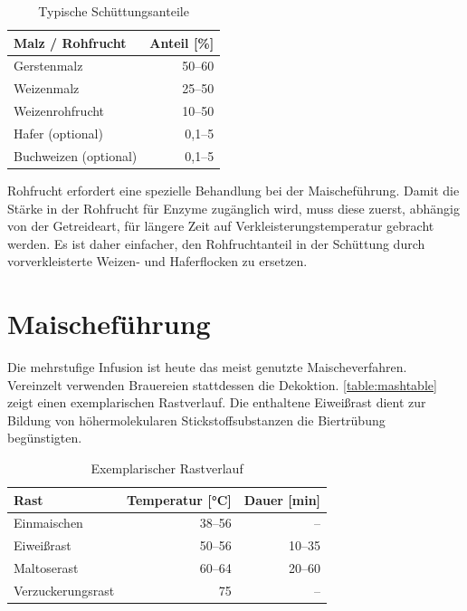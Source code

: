 \documentclass[a4paper,parskip=half]{scrartcl}
\begin{document}
\begin{table}[H]
\centering
\begin{tabular}{lr}
\toprule
Malz / Rohfrucht      & Anteil [\%] \\
\midrule
Gerstenmalz           & 50–60 \\
Weizenmalz            & 25–50 \\
Weizenrohfrucht       & 10–50 \\
Hafer (optional)      & 0,1–5 \\
Buchweizen (optional) & 0,1–5 \\
\bottomrule
\end{tabular}
\caption{Typische Schüttungsanteile \parencite[13]{Strottner1999}}
\label{table:grains}
\end{table}

Rohfrucht erfordert eine spezielle Behandlung bei der Maischeführung. Damit
die Stärke in der Rohfrucht für Enzyme zugänglich wird, muss diese zuerst,
abhängig von der Getreideart, für längere Zeit auf Verkleisterungstemperatur
gebracht werden. Es ist daher einfacher, den Rohfruchtanteil in der Schüttung
durch vorverkleisterte Weizen- und Haferflocken zu ersetzen.


\section*{Maischeführung}

Die mehrstufige Infusion ist heute das meist genutzte Maischeverfahren.
Vereinzelt verwenden Brauereien stattdessen die Dekoktion.  
\autoref{table:mashtable} zeigt einen exemplarischen Rastverlauf. Die enthaltene
Eiweißrast dient zur Bildung von höhermolekularen Stickstoffsubstanzen die
Biertrübung begünstigten. \parencite[12,16,78]{Strottner1999}

\begin{table}[H]
\centering
\begin{tabular}{lrr}
\toprule
Rast              & Temperatur [°C] & Dauer [min] \\
\midrule
Einmaischen       & 38–56          & –     \\
Eiweißrast        & 50–56          & 10–35 \\
Maltoserast       & 60–64          & 20–60 \\
Verzuckerungsrast & 75             & –     \\
\bottomrule
\end{tabular}
\caption{Exemplarischer Rastverlauf \parencite[16]{Strottner1999}}
\label{table:mashtable}
\end{table}
\end{document}
